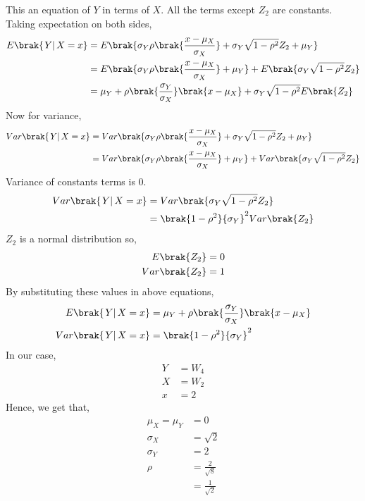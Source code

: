 \documentclass[journal,12pt,twocolumn]{IEEEtran}
\theoremstyle{remark}
\begin{document}
This an equation of $Y$ in terms of $X$. All the terms except $Z_2$ are constants. Taking expectation on both sides, 
\begin{align}
E\brak{\left.Y\right | X=x} &= E\brak{\sigma_Y\rho\brak{\frac{x - \mu_X}{\sigma_X}} + \sigma_Y\sqrt{1 - {\rho}^2}Z_2 + \mu_Y}\\
			    &= E\brak{\sigma_Y\rho\brak{\frac{x - \mu_X}{\sigma_X}} + \mu_Y} + E\brak{\sigma_Y\sqrt{1 - {\rho}^2}Z_2}\\
			    &= \mu_Y +\rho\brak{\frac{\sigma_Y}{\sigma_X}}\brak{x - \mu_X} + \sigma_Y\sqrt{1 - {\rho}^2}E\brak{Z_2}
\end{align}
Now for variance,
\begin{align}
Var\brak{\left.Y\right | X=x} &= Var\brak{\sigma_Y\rho\brak{\frac{x - \mu_X}{\sigma_X}} + \sigma_Y\sqrt{1 - {\rho}^2}Z_2 + \mu_Y}\\
			      &= Var\brak{\sigma_Y\rho\brak{\frac{x - \mu_X}{\sigma_X}} + \mu_Y} + Var\brak{\sigma_Y\sqrt{1 - {\rho}^2}Z_2}
\end{align}
Variance of constants terms is 0.
\begin{align}		      
Var\brak{\left.Y\right | X=x} &= Var\brak{\sigma_Y\sqrt{1 - {\rho}^2}Z_2}\\
			      &= {\brak{1 - {\rho}^2}{\sigma_Y}^2}Var\brak{Z_2}
\end{align}
$Z_2$ is a normal distribution so,
\begin{align}
E\brak{Z_2} &= 0\\
Var\brak{Z_2} &= 1
\end{align}
By substituting these values in above equations,
\begin{align}
E\brak{\left.Y\right | X=x} &= \mu_Y +\rho\brak{\frac{\sigma_Y}{\sigma_X}}\brak{x - \mu_X}\\
Var\brak{\left.Y\right | X=x} &= \brak{1 - {\rho}^2}{\sigma_Y}^2
\end{align}
In our case, 
\begin{align}
Y &= W_4\\
X &= W_2\\
x &= 2
\end{align}
Hence, we get that,
\begin{align}
\mu_X = \mu_Y &= 0\\ 
\sigma_X &= \sqrt{2}\\
\sigma_Y &= 2\\
\rho &= \frac{2}{\sqrt{8}}\\
     &= \frac{1}{\sqrt{2}}
\end{align} 
\end{document}
